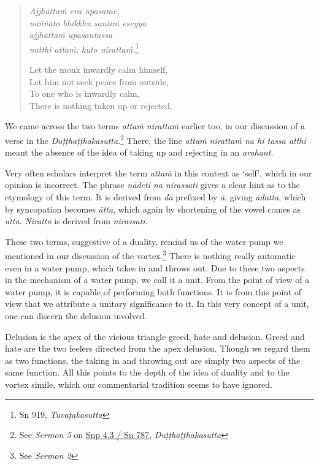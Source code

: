 \begin{quote}
\emph{Ajjhattaṁ eva upasame,}\\
\emph{nāññato bhikkhu santiṁ eseyya}\\
\emph{ajjhattaṁ upasantassa}\\
\emph{natthi attaṁ, kuto nirattaṁ.}\footnote{Sn 919, \emph{Tuvaṭakasutta}}

Let the monk inwardly calm himself,\\
Let him not seek peace from outside,\\
To one who is inwardly calm,\\
There is nothing taken up or rejected.
\end{quote}

We came across the two terms \emph{attaṁ nirattaṁ} earlier too, in our discussion of a verse in the \emph{Duṭṭhaṭṭhakasutta}.\footnote{See \emph{Sermon 5} on \href{https://suttacentral.net/snp4.3/pli/ms}{Snp 4.3 / Sn 787}, \emph{Duṭṭhaṭṭhakasutta}} There, the line \emph{attaṁ nirattaṁ na hi tassa atthi} meant the absence of the idea of taking up and rejecting in an \emph{arahant}.

Very often scholars interpret the term \emph{attaṁ} in this context as `self', which in our opinion is incorrect. The phrase \emph{nādeti na nirassati} gives a clear hint as to the etymology of this term. It is derived from \emph{dā} prefixed by \emph{ā}, giving \emph{ādatta}, which by syncopation becomes \emph{ātta}, which again by shortening of the vowel comes as \emph{atta}. \emph{Niratta} is derived from \emph{nirassati}.

These two terms, suggestive of a duality, remind us of the water pump we mentioned in our discussion of the vortex.\footnote{See \emph{Sermon 2}} There is nothing really automatic even in a water pump, which takes in and throws out. Due to these two aspects in the mechanism of a water pump, we call it a unit. From the point of view of a water pump, it is capable of performing both functions. It is from this point of view that we attribute a unitary significance to it. In this very concept of a unit, one can discern the delusion involved.

Delusion is the apex of the vicious triangle greed, hate and delusion. Greed and hate are the two feelers directed from the apex delusion. Though we regard them as two functions, the taking in and throwing out are simply two aspects of the same function. All this points to the depth of the idea of duality and to the vortex simile, which our commentarial tradition seems to have ignored.

